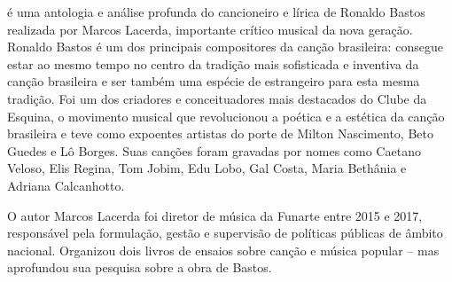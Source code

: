\hspace*{-7cm}\hrulefill\hspace*{-7cm}

\medskip

 é uma antologia e análise profunda do cancioneiro e lírica de Ronaldo Bastos realizada por Marcos Lacerda, importante crítico musical da nova geração. Ronaldo Bastos é um dos principais compositores da canção brasileira: consegue estar ao mesmo tempo no centro da tradição mais sofisticada e inventiva da canção brasileira e ser também uma espécie de estrangeiro para esta mesma tradição. Foi um dos criadores e conceituadores mais destacados do Clube da Esquina, o movimento musical que revolucionou a poética e a estética da canção brasileira e teve como expoentes artistas do porte de Milton Nascimento, Beto Guedes e Lô Borges. Suas canções foram gravadas por nomes como Caetano Veloso, Elis Regina, Tom Jobim, Edu Lobo, Gal Costa, Maria Bethânia e Adriana Calcanhotto.

O autor Marcos Lacerda foi diretor de música da Funarte entre 2015 e 2017, responsável pela formulação, gestão e supervisão de políticas públicas de âmbito nacional. Organizou dois livros de ensaios sobre canção e música popular – mas aprofundou sua pesquisa sobre a obra de Bastos.

\vfill

\hspace*{-.4cm}\begin{minipage}[c]{.5\linewidth}
\small{
{}}
\end{minipage}

\pagebreak

\hspace{.5cm}

